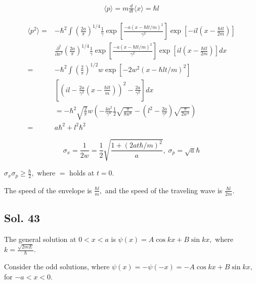     \begin{align*}
        \langle
        p
        \rangle
        =m\frac{d}{dt}\langle x\rangle = 
        \hbar l
    \end{align*}


    \begin{align*}
        \langle
        p^2
        \rangle
        = & -\hbar^2
        \int
        \left(
        \frac{2a}{\pi}
        \right)^{1/4}
        \frac{1}{\bar{\gamma}}
        \exp{\left[
        \frac{-a(x-\hbar lt/m)^2
       }{\gamma^2}
        \right]}
        \exp\left[
        -il(x-\frac{\hbar tl}{2m})
        \right]\\
        &\frac{\partial^2}{\partial x^2}
        \left(
        \frac{2a}{\pi}
        \right)^{1/4}
        \frac{1}{\gamma}
        \exp{\left[
        \frac{-a(x-\hbar lt/m)^2
       }{\gamma^2}
        \right]}
        \exp\left[
        il(x-\frac{\hbar tl}{2m})
        \right]
        dx\\
        = &
        -\hbar^2
        \int
        \left(
        \frac{2}{\pi}
        \right)^{1/2}
        w
        \exp{\left[
        -2w^2(x-\hbar lt/m)^2
        \right]}\\
        &
        \left[       
        (il-\frac{2a}{\gamma^2}(x-\frac{\hbar lt}{m}))^2
        -
        \frac{2a}{\gamma^2}
        \right]
        dx\\
        &=-\hbar^2
        \sqrt{\frac{2}{\pi}}w
        \left(-\frac{4a^2}{\gamma^4}
        \frac{1}{2}\sqrt{\frac{\pi}{8w^6}}
        -(l^2-\frac{2a}{\gamma^2})
        \sqrt{\frac{\pi}{2w^2}}
        \right)\\
        =&a\hbar^2+l^2\hbar^2
    \end{align*}

    $$
    \sigma_x=\frac{1}{2w}=\frac{1}{2}\sqrt{\frac{1+(2at\hbar/m)^2}{a}},\;
    \sigma_p=\sqrt{a}\hbar
    $$

    $\sigma_x\sigma_p\geq \frac{\hbar}{2},$ where $=$ holds at $t=0.$


    The speed of the envelope is $\frac{\hbar l}{m},$ and the speed of the traveling wave is $\frac{\hbar l}{2m}.$

    \subsection*{Sol. 43}
    The general solution at $0<x<a$ is $\psi(x)=A\cos kx+B\sin kx,$  where $k=\frac{\sqrt{2mE}}{\hbar}.$

    Consider the odd solutions, where $\psi(x)=-\psi(-x)
    =-A\cos kx+B\sin kx,$ for $-a<x<0.$

